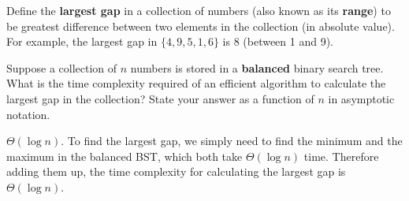 \begin{prob}
    Define the \textbf{largest gap} in a collection of numbers (also known as its \textbf{range}) to be
    greatest difference between two elements in the collection (in absolute value). For example, the
    largest gap in $\{4, 9, 5, 1, 6\}$ is 8 (between 1 and 9).

    Suppose a collection of $n$ numbers is stored in a \textbf{balanced} binary search tree. What is the
    time complexity required of an efficient algorithm to calculate the largest gap in the collection?
    State your answer as a function of $n$ in asymptotic notation.

    \begin{soln}
        $\Theta(\log n)$. To find the largest gap, we simply need to find the minimum and the maximum in 
        the balanced BST, which both take $\Theta(\log{n})$ time. Therefore adding them up, the time complexity for 
        calculating the largest gap is $\Theta(\log{n})$.
    \end{soln}

\end{prob}
